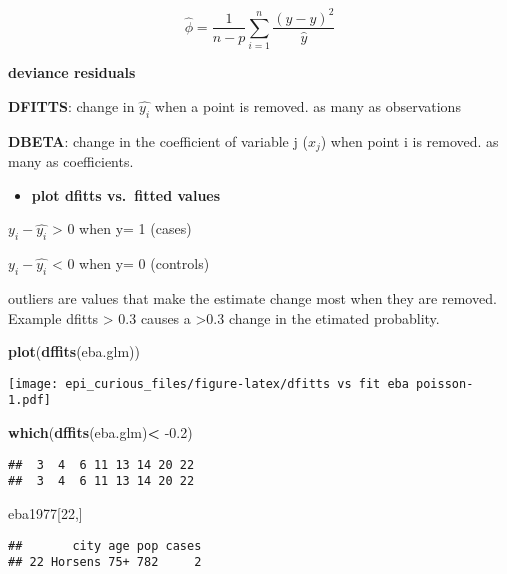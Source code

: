 \documentclass[
]{article}
\newenvironment{Shaded}{\begin{snugshade}}{\end{snugshade}}
\newcommand{\DecValTok}[1]{\textcolor[rgb]{0.00,0.00,0.81}{#1}}
\newcommand{\FloatTok}[1]{\textcolor[rgb]{0.00,0.00,0.81}{#1}}
\newcommand{\KeywordTok}[1]{\textcolor[rgb]{0.13,0.29,0.53}{\textbf{#1}}}
\newcommand{\NormalTok}[1]{#1}
\newcommand{\OperatorTok}[1]{\textcolor[rgb]{0.81,0.36,0.00}{\textbf{#1}}}
\newcommand{\StringTok}[1]{\textcolor[rgb]{0.31,0.60,0.02}{#1}}
\providecommand{\tightlist}{%
  \setlength{\itemsep}{0pt}\setlength{\parskip}{0pt}}
\begin{document}
\[\hat{\phi}=\frac{1}{n-p}\sum_{i=1}^n\frac{(y-\hat{y})^2}{\hat{y}}\]

\textbf{deviance residuals}

\textbf{DFITTS}: change in \(\hat{y_i}\) when a point is removed. as
many as observations

\textbf{DBETA}: change in the coefficient of variable j (\(x_j\)) when
point i is removed. as many as coefficients.

\begin{itemize}
\tightlist
\item
  \textbf{plot dfitts vs.~fitted values}
\end{itemize}

\(y_i- \hat{y_i}\) \textgreater{} 0 when y= 1 (cases)

\(y_i- \hat{y_i}\) \textless{} 0 when y= 0 (controls)

outliers are values that make the estimate change most when they are
removed. Example dfitts \textgreater{} 0.3 causes a \textgreater0.3
change in the etimated probablity.

\begin{Shaded}
\begin{Highlighting}[]
\KeywordTok{plot}\NormalTok{(}\KeywordTok{dffits}\NormalTok{(eba.glm))}
\end{Highlighting}
\end{Shaded}

\texttt{[image: epi\_curious\_files/figure-latex/dfitts vs fit eba poisson-1.pdf]}

\begin{Shaded}
\begin{Highlighting}[]
\KeywordTok{which}\NormalTok{(}\KeywordTok{dffits}\NormalTok{(eba.glm)}\OperatorTok{<}\StringTok{ }\FloatTok{-0.2}\NormalTok{)}
\end{Highlighting}
\end{Shaded}

\begin{verbatim}
##  3  4  6 11 13 14 20 22 
##  3  4  6 11 13 14 20 22
\end{verbatim}

\begin{Shaded}
\begin{Highlighting}[]
\NormalTok{eba1977[}\DecValTok{22}\NormalTok{,]}
\end{Highlighting}
\end{Shaded}

\begin{verbatim}
##       city age pop cases
## 22 Horsens 75+ 782     2
\end{verbatim}
\end{document}
